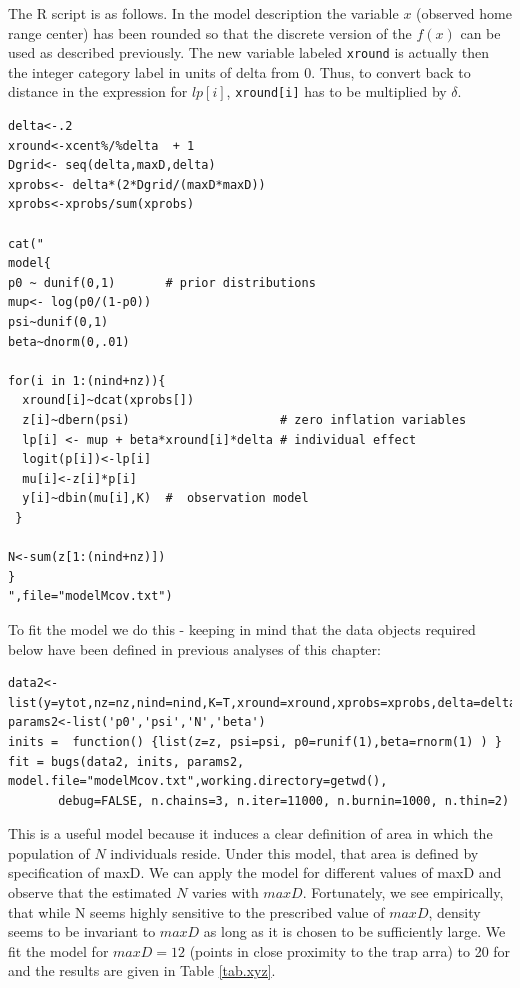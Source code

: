 The R script is as follows. In the model description the variable $x$ (observed home range center) has been rounded so that the discrete version of the $f(x)$ can be used as described previously. The new variable labeled \mbox{\tt xround} is actually then the integer category label in units of delta from 0. Thus, to convert back to distance in the expression for $lp[i]$, \mbox{\tt xround[i]} has to be multiplied by $\delta$.

\begin{verbatim}
delta<-.2
xround<-xcent%/%delta  + 1
Dgrid<- seq(delta,maxD,delta)
xprobs<- delta*(2*Dgrid/(maxD*maxD))
xprobs<-xprobs/sum(xprobs)

cat("
model{
p0 ~ dunif(0,1)       # prior distributions
mup<- log(p0/(1-p0))
psi~dunif(0,1)
beta~dnorm(0,.01)

for(i in 1:(nind+nz)){
  xround[i]~dcat(xprobs[])
  z[i]~dbern(psi)                     # zero inflation variables
  lp[i] <- mup + beta*xround[i]*delta # individual effect
  logit(p[i])<-lp[i]
  mu[i]<-z[i]*p[i]
  y[i]~dbin(mu[i],K)  #  observation model
 }

N<-sum(z[1:(nind+nz)])
}
",file="modelMcov.txt")
\end{verbatim}

To fit the model we do this - keeping in mind that the data objects required below have been defined in previous analyses of this chapter:

\begin{verbatim}
data2<-list(y=ytot,nz=nz,nind=nind,K=T,xround=xround,xprobs=xprobs,delta=delta)
params2<-list('p0','psi','N','beta')
inits =  function() {list(z=z, psi=psi, p0=runif(1),beta=rnorm(1) ) }
fit = bugs(data2, inits, params2, model.file="modelMcov.txt",working.directory=getwd(),
       debug=FALSE, n.chains=3, n.iter=11000, n.burnin=1000, n.thin=2)
\end{verbatim}

This is a useful model because it induces a clear definition of area in which the population of $N$ individuals reside. Under this model, that area is defined  by specification of maxD. We can apply the model for different values of maxD and observe that the estimated $N$ varies with $maxD$. Fortunately, we see empirically, that while N seems highly sensitive to the prescribed value of $maxD$, density seems to be invariant to $maxD$ as long as it is chosen to be sufficiently large. We fit the model for $maxD=12$ (points in close proximity to the trap arra)  to 20 for and the results are given in Table \ref{tab.xyz}.

